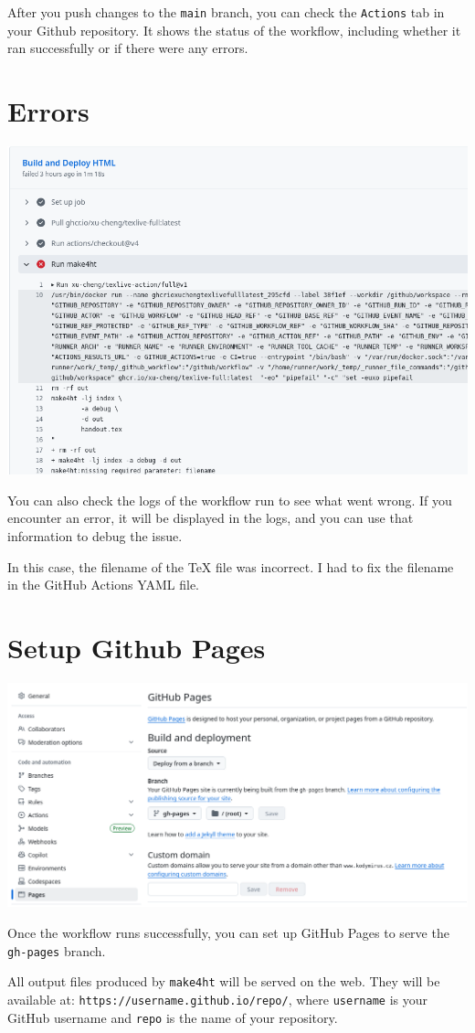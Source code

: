 \documentclass{book}
\begin{document}
After you push changes to the \texttt{main} branch, you can check the \texttt{Actions} tab in your
Github repository. It shows the status of the workflow, including whether it ran successfully or if there were any errors.


\section{Errors}
\includegraphics[width=\textwidth]{img/github-error.png}


You can also check the logs of the workflow run to see what went wrong.
If you encounter an error, it will be displayed in the logs, and you can use that
information to debug the issue.

In this case, the filename of the TeX file was incorrect. I had to fix the filename in the GitHub Actions YAML file.


\section{Setup Github Pages}
\includegraphics[width=\textwidth]{img/github-pages.png}

Once the workflow runs successfully, you can set up GitHub Pages to serve the \texttt{gh-pages} branch.

All output files produced by \texttt{make4ht} will be served on the web.
They will be available at:
\verb|https://username.github.io/repo/|,
where \texttt{username} is your GitHub username and \texttt{repo} is the name of your repository.
\end{document}
